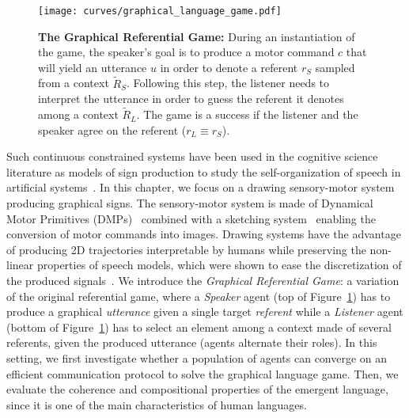 \begin{figure}[h!]
\centering 
\texttt{[image: curves/graphical\_language\_game.pdf]}
\caption{\textbf{The Graphical Referential Game:} During an instantiation of the game, the speaker's goal is to produce a motor command $c$ that will yield an utterance $u$ in order to denote a referent $r_S$ sampled from a context $\tilde{R}_S$. Following this step, the listener needs to interpret the utterance in order to guess the referent it denotes among a context $\tilde{R}_L$. The game is a success if the listener and the speaker agree on the referent ($r_L\equiv r_S$).}%
\label{fig:1}
\end{figure}

Such continuous constrained systems have been used in the cognitive science literature as models of sign production to study the self-organization of speech in artificial systems~\citep{deBoer2000selforganization,oudeyer2006selforganization,MOULINFRIER20155}. 
In this chapter, we focus on a drawing sensory-motor system producing graphical signs. The sensory-motor system is made of Dynamical Motor Primitives (DMPs)~\citep{schaal2006dynamic} combined with a sketching system~\citep{Mihai2021DifferentiableDA} enabling the conversion of motor commands into images.  Drawing systems have the advantage of producing 2D trajectories interpretable by humans while preserving the non-linear properties of speech models, which were shown to ease the discretization of the produced signals~\citep{STEVENS19893,MOULINFRIER20155}. We introduce the \textit{Graphical Referential Game}: a variation of the original referential game, where a \textit{Speaker} agent (top of Figure~\ref{fig:1}) has to produce a graphical \textit{utterance} given a single target \textit{referent} while a \textit{Listener} agent (bottom of Figure~\ref{fig:1}) has to select an element among a context made of several referents, given the produced utterance (agents alternate their roles).  In this setting, we first investigate whether a population of agents can converge on an efficient communication protocol to solve the graphical language game. Then, we evaluate the coherence and compositional properties of the emergent language, since it is one of the main characteristics of human languages.

